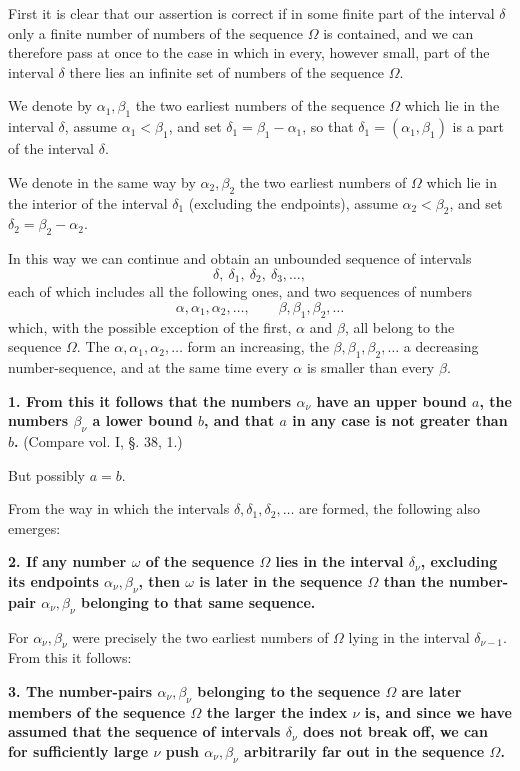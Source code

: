 \documentclass[11pt]{article}
\begin{document}
First it is clear that our assertion is correct if in some finite part of the interval $\delta$ only a finite number of numbers of the sequence $\Omega$ is contained, and we can therefore pass at once to the case in which in every, however small, part of the interval $\delta$ there lies an infinite set of numbers of the sequence $\Omega$.

We denote by $\alpha_1,\beta_1$ the two earliest numbers of the sequence $\Omega$ which lie in the interval $\delta$, assume $\alpha_1<\beta_1$, and set $\delta_1=\beta_1-\alpha_1$, so that $\delta_1=(\alpha_1,\beta_1)$ is a part of the interval $\delta$.

We denote in the same way by $\alpha_2,\beta_2$ the two earliest numbers of $\Omega$ which lie in the interior of the interval $\delta_1$ (excluding the endpoints), assume $\alpha_2<\beta_2$, and set $\delta_2=\beta_2-\alpha_2$.

In this way we can continue and obtain an unbounded sequence of intervals
\[
\delta,\ \delta_1,\ \delta_2,\ \delta_3,\ldots,
\]
each of which includes all the following ones, and two sequences of numbers
\[
\alpha,\alpha_1,\alpha_2,\ldots,\qquad
\beta,\beta_1,\beta_2,\ldots
\]
which, with the possible exception of the first, $\alpha$ and $\beta$, all belong to the sequence $\Omega$. The $\alpha,\alpha_1,\alpha_2,\ldots$ form an increasing, the $\beta,\beta_1,\beta_2,\ldots$ a decreasing number-sequence, and at the same time every $\alpha$ is smaller than every $\beta$.

\textbf{1. From this it follows that the numbers $\alpha_\nu$ have an upper bound $a$, the numbers $\beta_\nu$ a lower bound $b$, and that $a$ in any case is not greater than $b$.} (Compare vol. I, §. 38, 1.)

But possibly $a=b$.

From the way in which the intervals $\delta,\delta_1,\delta_2,\ldots$ are formed, the following also emerges:

\textbf{2. If any number $\omega$ of the sequence $\Omega$ lies in the interval $\delta_\nu$, excluding its endpoints $\alpha_\nu,\beta_\nu$, then $\omega$ is later in the sequence $\Omega$ than the number-pair $\alpha_\nu,\beta_\nu$ belonging to that same sequence.}

For $\alpha_\nu,\beta_\nu$ were precisely the two earliest numbers of $\Omega$ lying in the interval $\delta_{\nu-1}$. From this it follows:

\textbf{3. The number-pairs $\alpha_\nu,\beta_\nu$ belonging to the sequence $\Omega$ are later members of the sequence $\Omega$ the larger the index $\nu$ is, and since we have assumed that the sequence of intervals $\delta_\nu$ does not break off, we can for sufficiently large $\nu$ push $\alpha_\nu,\beta_\nu$ arbitrarily far out in the sequence $\Omega$.}
\end{document}
